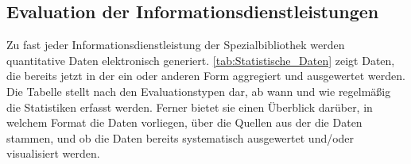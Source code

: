 \subsection{Evaluation der Informationsdienstleistungen}

Zu fast jeder Informationsdienstleistung der Spezialbibliothek werden quantitative Daten elektronisch generiert. 
\autoref{tab:Statistische_Daten} zeigt Daten, die bereits jetzt in der ein oder anderen Form aggregiert und ausgewertet werden. 
Die Tabelle stellt nach den Evaluationstypen dar, ab wann und wie regelmäßig die Statistiken erfasst werden. Ferner bietet sie einen Überblick darüber, in welchem 
Format die Daten vorliegen, über die Quellen aus der die Daten stammen, und ob die Daten bereits systematisch ausgewertet und/oder visualisiert werden.


\begingroup
\setlength{\tabcolsep}{4pt} %
\renewcommand{\arraystretch}{1.5}
